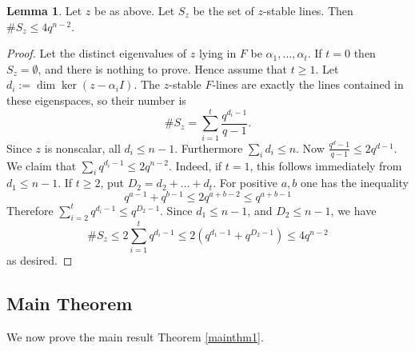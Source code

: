 \documentclass[preprint,11pt]{amsart}
\theoremstyle{definition}
\numberwithin{thm}{section}
\newtheorem{lem}[thm]{Lemma}
\newcommand{\al}{\alpha}
\begin{document}
\begin{lem}\label{nonzstable_count}
Let $z$ be as above. Let $S_z$ be the set of $z$-stable lines. Then $\# S_z \leq 4 q^{n-2}$. 
\end{lem}

\begin{proof}
Let the distinct eigenvalues of $z$ lying in $F$ be $\al_1, \ldots, \al_t$. 
If $t = 0$ then $S_z = \emptyset$, and there is nothing to prove. Hence assume that $t \geq 1$. Let $d_i := \dim \ker(z - \al_iI)$. The $z$-stable $F$-lines are exactly the lines contained in these eigenspaces, so their number is 
$$
 \# S_z = \sum_{i = 1}^t \frac{q^{d_i -1}}{q-1}.
$$
Since $z$ is nonscalar, all $d_i \leq n-1$. Furthermore $\sum_i d_i \leq n$. Now $\frac{q^d-1}{q-1} \leq 2 q^{d-1}$. We claim that $\sum_i q^{d_i -1} \leq 2q^{n-2}$. Indeed, if $t = 1$, this follows immediately from $d_1 \leq n-1$. If $t \geq 2$, put $D_2 = d_2 + \ldots +d_t$. For positive $a,b$ one has the inequality 
$$
q^{a-1} + q^{b-1} \leq 2q^{a+b-2} \leq q^{a+b-1}
$$
Therefore $\sum_{i = 2}^t q^{d_i -1} \leq q^{D_2-1}$. Since $d_1 \leq n-1$, and $D_2 \leq n-1$, we have 
$$
\# S_z \leq 2 \sum_{i = 1}^{t} q^{d_i -1} \leq 2(q^{d_1 -1} + q^{D_2 -1}) \leq  4 q^{n-2}
$$
as desired.
\end{proof}



\subsection{Main Theorem}

We now prove the main result Theorem \ref{mainthm1}.
\end{document}
